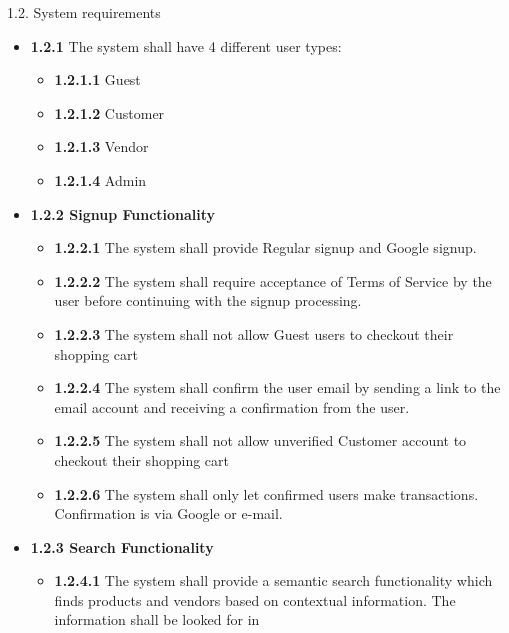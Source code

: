 \documentclass[]{article}
\providecommand{\tightlist}{%
  \setlength{\itemsep}{0pt}\setlength{\parskip}{0pt}}
\begin{document}
1.2. System requirements

\begin{itemize}
    \item
          \textbf{1.2.1} The system shall have 4 different user types:

          \begin{itemize}
              \tightlist
              \item
                    \textbf{1.2.1.1} Guest
              \item
                    \textbf{1.2.1.2} Customer
              \item
                    \textbf{1.2.1.3} Vendor
              \item
                    \textbf{1.2.1.4} Admin
          \end{itemize}
    \item
          \textbf{1.2.2 Signup Functionality}

          \begin{itemize}
              \tightlist
              \item
                    \textbf{1.2.2.1} The system shall provide Regular signup and Google
                    signup.
              \item
                    \textbf{1.2.2.2} The system shall require acceptance of Terms of
                    Service by the user before continuing with the signup processing.
              \item
                    \textbf{1.2.2.3} The system shall not allow Guest users to checkout
                    their shopping cart
              \item
                    \textbf{1.2.2.4} The system shall confirm the user email by sending
                    a link to the email account and receiving a confirmation from the
                    user.
              \item
                    \textbf{1.2.2.5} The system shall not allow unverified Customer
                    account to checkout their shopping cart
              \item
                    \textbf{1.2.2.6} The system shall only let confirmed users make
                    transactions. Confirmation is via Google or e-mail.
          \end{itemize}
    \item
          \textbf{1.2.3 Search Functionality}

          \begin{itemize}
              \item
                    \textbf{1.2.4.1} The system shall provide a semantic search
                    functionality which finds products and vendors based on contextual
                    information. The information shall be looked for in


\end{itemize}
\end{itemize}
\end{document}

